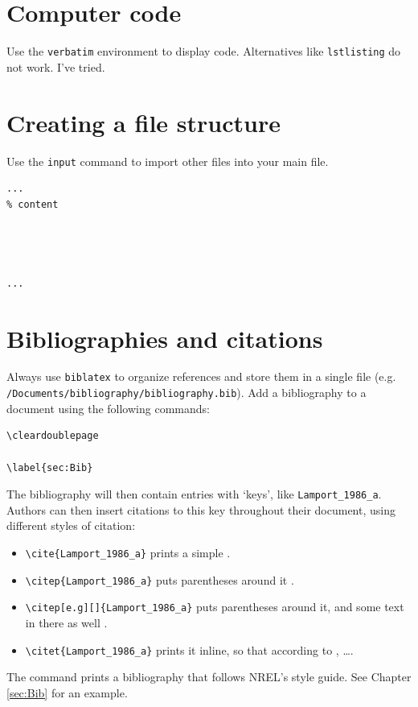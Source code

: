 \documentclass[12pt,letterpaper]{report}
\begin{document}
\section{Computer code}
Use the \texttt{verbatim} environment to display code. Alternatives like \texttt{lstlisting} do not work. I've tried.

\section{Creating a file structure}
\label{sec:FileStructure}
Use the \texttt{input} command to import other files into your main file. 

\begin{verbatim}
...
% content




...
\end{verbatim}

\section{Bibliographies and citations}
\label{Sec:Bib}
Always use \texttt{biblatex} to organize references and store them in a single file (e.g. \verb+/Documents/bibliography/bibliography.bib+). Add a bibliography to a document using the following commands:

\begin{verbatim}
\cleardoublepage

\label{sec:Bib}

\end{verbatim}

The bibliography will then contain entries with `keys', like \texttt{Lamport\_1986\_a}. Authors can then insert citations to this key throughout their document, using different styles of citation:
\begin{itemize}
\item \verb+\cite{Lamport_1986_a}+ prints a simple \cite{Lamport_1986_a}.
\item \verb+\citep{Lamport_1986_a}+ puts parentheses around it \citep{Lamport_1986_a}.
\item \verb+\citep[e.g][]{Lamport_1986_a}+ puts parentheses around it, and some text in there as well \citep[e.g.][]{Lamport_1986_a}.
\item \verb+\citet{Lamport_1986_a}+ prints it inline, so that according to \citet{Lamport_1986_a}, \ldots.
\end{itemize}

The command \verb++ prints a bibliography that follows NREL's style guide. See Chapter \ref{sec:Bib} for an example.
\end{document}

